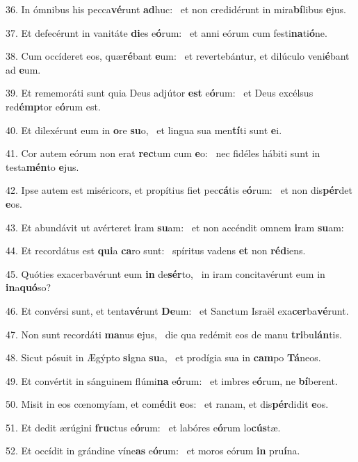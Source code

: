 36. In ómnibus his pecca\textbf{vé}runt \textbf{ad}huc: \ast\  et non credidérunt in mira\textbf{bí}libus \textbf{e}jus.\

37. Et defecérunt in vanitáte \textbf{di}es e\textbf{ó}rum: \ast\  et anni eórum cum festi\textbf{na}ti\textbf{ó}ne.\

38. Cum occíderet eos, quæ\textbf{ré}bant \textbf{e}um: \ast\  et revertebántur, et dilúculo veni\textbf{é}bant ad \textbf{e}um.\

39. Et rememoráti sunt quia Deus adjútor \textbf{est} e\textbf{ó}rum: \ast\  et Deus excélsus red\textbf{émp}tor e\textbf{ó}rum est.\

40. Et dilexérunt eum in \textbf{o}re \textbf{su}o, \ast\  et lingua sua men\textbf{tí}ti sunt \textbf{e}i.\

41. Cor autem eórum non erat \textbf{rec}tum cum \textbf{e}o: \ast\  nec fidéles hábiti sunt in testa\textbf{mén}to \textbf{e}jus.\

42. Ipse autem est miséricors, et propítius fiet pec\textbf{cá}tis e\textbf{ó}rum: \ast\  et non dis\textbf{pér}det \textbf{e}os.\

43. Et abundávit ut avérteret \textbf{i}ram \textbf{su}am: \ast\  et non accéndit omnem \textbf{i}ram \textbf{su}am:\

44. Et recordátus est \textbf{qui}a \textbf{ca}ro sunt: \ast\  spíritus vadens \textbf{et} non \textbf{réd}iens.\

45. Quóties exacerbavérunt eum \textbf{in} de\textbf{sér}to, \ast\  in iram concitavérunt eum in \textbf{in}a\textbf{quó}so?\

46. Et convérsi sunt, et tenta\textbf{vé}runt \textbf{De}um: \ast\  et Sanctum Israël exa\textbf{cer}ba\textbf{vé}runt.\

47. Non sunt recordáti \textbf{ma}nus \textbf{e}jus, \ast\  die qua redémit eos de manu \textbf{tri}bu\textbf{lán}tis.\

48. Sicut pósuit in Ægýpto \textbf{si}gna \textbf{su}a, \ast\  et prodígia sua in \textbf{cam}po \textbf{Tá}neos.\

49. Et convértit in sánguinem flúmi\textbf{na} e\textbf{ó}rum: \ast\  et imbres e\textbf{ó}rum, ne \textbf{bí}berent.\

50. Misit in eos cœnomyíam, et com\textbf{é}dit \textbf{e}os: \ast\  et ranam, et dis\textbf{pér}didit \textbf{e}os.\

51. Et dedit ærúgini \textbf{fruc}tus e\textbf{ó}rum: \ast\  et labóres e\textbf{ó}rum lo\textbf{cús}tæ.\

52. Et occídit in grándine víne\textbf{as} e\textbf{ó}rum: \ast\  et moros eórum \textbf{in} pru\textbf{í}na.\

